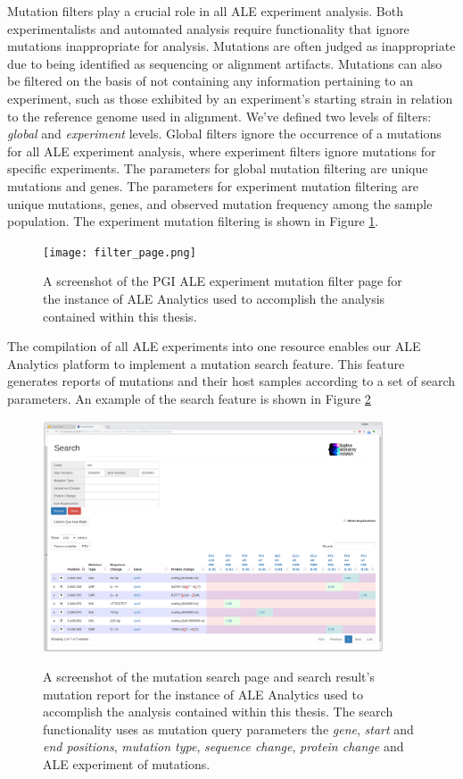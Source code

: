 \documentclass[12pt,final,masters,chapterheads]{ucsd}  %
\begin{document}
Mutation filters play a crucial role in all ALE experiment analysis. Both experimentalists and automated analysis require functionality that ignore mutations inappropriate for analysis. Mutations are often judged as inappropriate due to being identified as sequencing or alignment artifacts. Mutations can also be filtered on the basis of not containing any information pertaining to an experiment, such as those exhibited by an experiment's starting strain in relation to the reference genome used in alignment. We've defined two levels of filters: \textit{global} and \textit{experiment} levels. Global filters ignore the occurrence of a mutations for all ALE experiment analysis, where experiment filters ignore mutations for specific experiments. The parameters for global mutation filtering are unique mutations and genes. The parameters for experiment mutation filtering are unique mutations, genes, and observed mutation frequency among the sample population. The experiment mutation filtering is shown in Figure \ref{fig:filter_page}.
\begin{figure}[H]
  \caption{A screenshot of the PGI ALE experiment mutation filter page for the instance of ALE Analytics used to accomplish the analysis contained within this thesis.}
  \centering
  \texttt{[image: filter\_page.png]}
  \label{fig:filter_page}
\end{figure}
The compilation of all ALE experiments into one resource enables our ALE Analytics platform to implement a mutation search feature. This feature generates reports of mutations and their host samples according to a set of search parameters. An example of the search feature is shown in Figure \ref{fig:search_page}
\begin{figure}[H]
  \caption{A screenshot of the mutation search page and search result's mutation report for the instance of ALE Analytics used to accomplish the analysis contained within this thesis. The search functionality uses as mutation query parameters the \textit{gene}, \textit{start} and \textit{end positions}, \textit{mutation type}, \textit{sequence change}, \textit{protein change} and ALE experiment of mutations.}
  \centering
  \includegraphics[width=0.9\textwidth]{search_page.png}
  \label{fig:search_page}
\end{figure}
\end{document}
